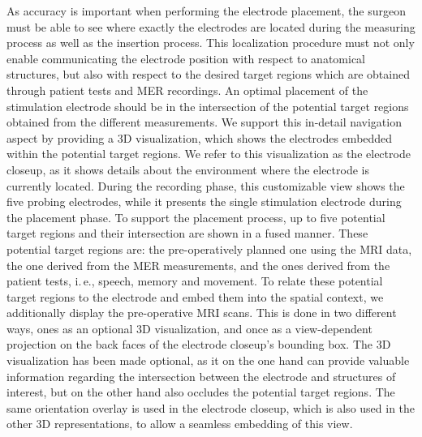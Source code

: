 \documentclass[journal]{vgtc}                %
\begin{document}
As accuracy is important when performing the electrode placement, the surgeon must be able to see where exactly the electrodes are located during the measuring process as well as the insertion process. This localization procedure must not only enable communicating the electrode position with respect to anatomical structures, but also with respect to the desired target regions which are obtained through patient tests and MER recordings. An optimal placement of the stimulation electrode should be in the intersection of the potential target regions obtained from the different measurements. We support this in-detail navigation aspect by providing a 3D visualization, which shows the electrodes embedded within the potential target regions. We refer to this visualization as the electrode closeup, as it shows details about the environment where the electrode is currently located. During the recording phase, this customizable view shows the five probing electrodes, while it presents the single stimulation electrode during the placement phase. To support the placement process, up to five potential target regions and their intersection are shown in a fused manner. These potential target regions are: the pre-operatively planned one using the MRI data, the one derived from the MER measurements, and the ones derived from the patient tests, i.\,e., speech, memory and movement. To relate these potential target regions to the electrode and embed them into the spatial context, we additionally display the pre-operative MRI scans. This is done in two different ways, ones as an optional 3D visualization, and once as a view-dependent projection on the back faces of the electrode closeup's bounding box. The 3D visualization has been made optional, as it on the one hand can provide valuable information regarding the intersection between the electrode and structures of interest, but on the other hand also occludes the potential target regions. The same orientation overlay is used in the electrode closeup, which is also used in the other 3D representations, to allow a seamless embedding of this view.
\end{document}

